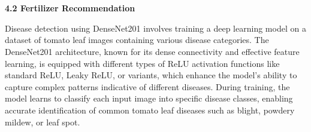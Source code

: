 \documentclass[12pt, English]{article}
\newcommand\tab[1][1cm]{\hspace*{#1}}
\begin{document}
\begin{normalsize}


\\
\\
\begin{large}
\textbf{4.2 Fertilizer Recommendation }\\
\end{large}
\tab  
\text Disease detection using DenseNet201 involves training a deep learning model on a dataset of tomato leaf images containing various disease categories. The DenseNet201 architecture, known for its dense connectivity and effective feature learning, is equipped with different types of ReLU activation functions like standard ReLU, Leaky ReLU, or variants, which enhance the model's ability to capture complex patterns indicative of different diseases. During training, the model learns to classify each input image into specific disease classes, enabling accurate identification of common tomato leaf diseases such as blight, powdery mildew, or leaf spot.\\

\end{normalsize}
\end{document}
